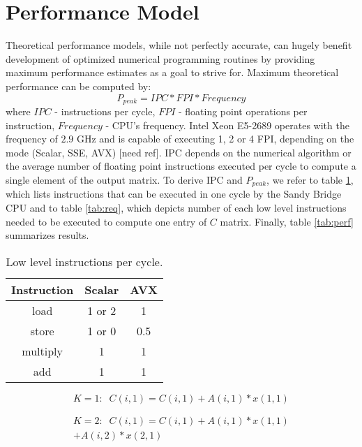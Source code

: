 \documentclass[journal, a4paper]{IEEEtran}
\begin{document}
\section{Performance Model}
    Theoretical performance models, while not perfectly accurate, can hugely benefit development of optimized numerical programming routines by providing maximum performance estimates as a goal to strive for. Maximum theoretical performance can be computed by: 
    \begin{equation}
     P_{peak} = IPC * FPI * Frequency
    \end{equation}
    where $IPC$ - instructions per cycle, $FPI$ - floating point operations per instruction, $Frequency$ - CPU's frequency. Intel Xeon E5-2689 operates with the frequency of $2.9$ GHz and is capable of executing 1, 2 or 4 FPI, depending on the mode (Scalar, SSE, AVX) [need ref]. IPC depends on the numerical algorithm or the average number of floating point instructions executed per cycle to compute a single element of the output matrix. To derive IPC and $P_{peak}$, we refer to table \ref{tab:low_level}, which lists instructions that can be executed in one cycle by the Sandy Bridge CPU and to table \ref{tab:req}, which depicts number of each low level instructions needed to be executed to compute one entry of $C$ matrix. Finally, table \ref{tab:perf} summarizes results.
    
      \begin{table}[!hbt]
	\begin{center}
	  \caption{Low level instructions per cycle.}
	  \label{tab:low_level}
	  \begin{tabular}{c|c|c}
		  Instruction	& Scalar & AVX \\
		  \hline
		  load		& 1 or 2 & 1 \\
		  \hline
		  store		& 1 or 0 & 0.5 \\
		  \hline
		  multiply	& 1 & 1 \\
		  \hline
		  add 		& 1 & 1 \\
	  \end{tabular}
	\end{center}
      \end{table}
      
      \begin{equation}      
	  K=1:\;\;C(i, 1) = C(i, 1) + A(i, 1) * x(1, 1) 
      \end{equation} 
      
      \begin{equation}      
	\begin{split}
	  K=2:\;\;C(i, 1) = C(i, 1)  + A(i, 1) * x(1, 1) \\+ A(i, 2) * x(2, 1)
	\end{split}
      \end{equation}
      
\end{document}
